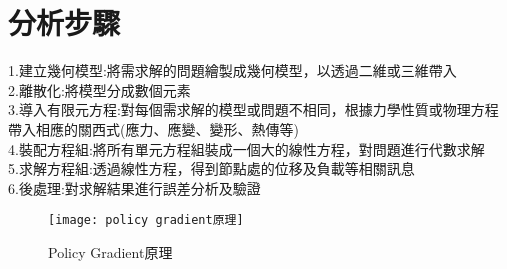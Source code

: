 \section{分析步驟}

1.建立幾何模型:將需求解的問題繪製成幾何模型，以透過二維或三維帶入\\

2.離散化:將模型分成數個元素\\

3.導入有限元方程:對每個需求解的模型或問題不相同，根據力學性質或物理方程帶入相應的關西式(應力、應變、變形、熱傳等)\\

4.裝配方程組:將所有單元方程組裝成一個大的線性方程，對問題進行代數求解\\

5.求解方程組:透過線性方程，得到節點處的位移及負載等相關訊息\\

6.後處理:對求解結果進行誤差分析及驗證\\
\newpage

\begin{figure}[hbt!]
\begin{center}
\texttt{[image: policy gradient原理]}
\caption{\Large Policy Gradient原理}
\label{Policy Gradient原理}
\end{center}
\end{figure}
\newpage
